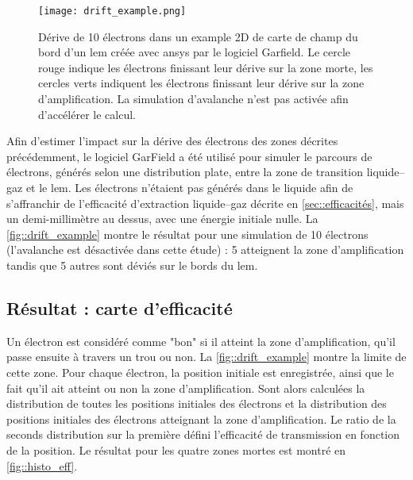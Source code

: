                 \begin{wrapfigure}[21]{r}{0.4\textwidth}
                    \texttt{[image: drift\_example.png]}
                    \caption[Dérive de 10 électrons dans la carte de champ du bord d'un \gls{lem} avec Garfield.]{Dérive de 10 électrons dans un example 2D de carte de champ du bord d'un \gls{lem} créée avec \gls{ansys} par le logiciel Garfield. Le cercle rouge indique les électrons finissant leur dérive sur la zone morte, les cercles verts indiquent les électrons finissant leur dérive sur la zone d'amplification. La simulation d'avalanche n'est pas activée afin d'accélérer le calcul.}
                    \label{fig::drift_example}
                \end{wrapfigure}
                
                Afin d'estimer l'impact sur la dérive des électrons des zones décrites précédemment, le logiciel GarField \cite{garfield} a été utilisé pour simuler le parcours de  électrons, générés selon une distribution plate, entre la zone de transition liquide--gaz et le \gls{lem}. Les électrons n'étaient pas générés dans le liquide afin de s'affranchir de l'efficacité d'extraction liquide--gaz décrite en \autoref{sec::efficacités}, mais un demi-millimètre au dessus, avec une énergie initiale nulle. La \autoref{fig::drift_example} %
                montre le résultat pour une simulation de 10 électrons (l'avalanche est désactivée dans cette étude) : 5  atteignent la zone d'amplification tandis que 5 autres sont déviés sur le bords du \gls{lem}.
                
        \subsection{Résultat : carte d'efficacité}
        
            Un électron est considéré comme "bon" si il atteint la zone d'amplification, qu'il passe ensuite à travers un trou ou non. La \autoref{fig::drift_example} montre la limite de cette zone. Pour chaque électron, la position initiale est enregistrée, ainsi que le fait qu'il ait atteint ou non la zone d'amplification. Sont alors calculées la distribution de toutes les positions initiales des électrons et la distribution des positions initiales des électrons atteignant la zone d'amplification. Le ratio de la seconds distribution sur la première défini l'efficacité de transmission en fonction de la position. Le résultat pour les quatre zones mortes est montré en \autoref{fig::histo_eff}.
            
